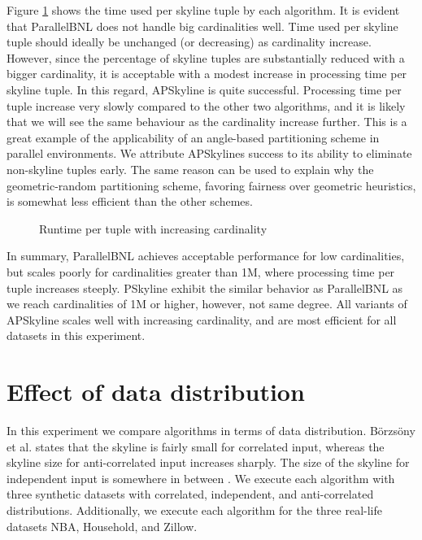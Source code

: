 \documentclass[12pt,a4paper,twoside]{report}
\begin{document}
Figure \ref{fig:test-cardinality-perstuple} shows the time used per
skyline tuple by each algorithm. It is evident that ParallelBNL does
not handle big cardinalities well. Time used per skyline tuple should
ideally be unchanged (or decreasing) as cardinality increase. However,
since the percentage of skyline tuples are substantially reduced with
a bigger cardinality, it is acceptable with a modest increase in
processing time per skyline tuple. In this regard, APSkyline is quite
successful. Processing time per tuple increase very slowly compared to
the other two algorithms, and it is likely that we will see the same
behaviour as the cardinality increase further. This is a great example
of the applicability of an angle-based partitioning scheme in parallel
environments. We attribute APSkylines success to its ability to
eliminate non-skyline tuples early. The same reason can be used to
explain why the geometric-random partitioning scheme, favoring
fairness over geometric heuristics, is somewhat less efficient than
the other schemes.

\begin{figure}[H]
	\centering
	\caption{Runtime per tuple with increasing cardinality}
	\label{fig:test-cardinality-perstuple}
\end{figure}

In summary, ParallelBNL achieves acceptable performance for low
cardinalities, but scales poorly for cardinalities greater than 1M,
where processing time per tuple increases steeply. PSkyline exhibit
the similar behavior as ParallelBNL as we reach cardinalities of 1M or
higher, however, not same degree. All variants of APSkyline scales
well with increasing cardinality, and are most efficient for all
datasets in this experiment.

\section{Effect of data distribution}
\label{sec:test3}

In this experiment we compare algorithms in terms of data
distribution.  Börzsöny et al. states that the skyline is fairly small
for correlated input, whereas the skyline size for anti-correlated
input increases sharply. The size of the skyline for independent
input is somewhere in between \cite{borzsony2001skyline}. We
execute each algorithm with three synthetic datasets with
correlated, independent, and anti-correlated  distributions.
Additionally, we execute each algorithm for the three real-life
datasets NBA, Household, and Zillow.
\end{document}
